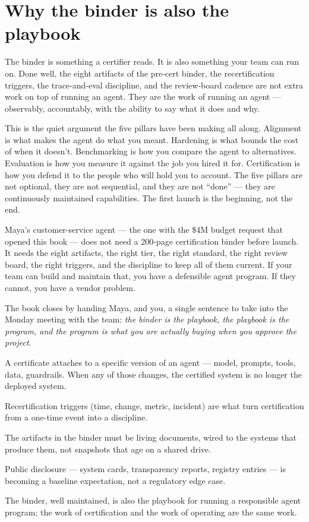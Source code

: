 \section{Why the binder is also the playbook}

The binder is something a certifier reads. It is also something your team can run on. Done well, the eight artifacts of the pre-cert binder, the recertification triggers, the trace-and-eval discipline, and the review-board cadence are not extra work on top of running an agent. They are the work of running an agent --- observably, accountably, with the ability to say what it does and why.

This is the quiet argument the five pillars have been making all along. Alignment is what makes the agent do what you meant. Hardening is what bounds the cost of when it doesn't. Benchmarking is how you compare the agent to alternatives. Evaluation is how you measure it against the job you hired it for. Certification is how you defend it to the people who will hold you to account. The five pillars are not optional, they are not sequential, and they are not ``done'' --- they are continuously maintained capabilities. The first launch is the beginning, not the end.

Maya's customer-service agent --- the one with the \$4M budget request that opened this book --- does not need a 200-page certification binder before launch. It needs the eight artifacts, the right tier, the right standard, the right review board, the right triggers, and the discipline to keep all of them current. If your team can build and maintain that, you have a defensible agent program. If they cannot, you have a vendor problem.

The book closes by handing Maya, and you, a single sentence to take into the Monday meeting with the team: \textit{the binder is the playbook, the playbook is the program, and the program is what you are actually buying when you approve the project.}

\TNrule

\stoptwocol

\begin{TNkeytakeaways}
\item A certificate attaches to a specific version of an agent --- model, prompts, tools, data, guardrails. When any of those changes, the certified system is no longer the deployed system.
\item Recertification triggers (time, change, metric, incident) are what turn certification from a one-time event into a discipline.
\item The artifacts in the binder must be living documents, wired to the systems that produce them, not snapshots that age on a shared drive.
\item Public disclosure --- system cards, transparency reports, registry entries --- is becoming a baseline expectation, not a regulatory edge case.
\item The binder, well maintained, is also the playbook for running a responsible agent program; the work of certification and the work of operating are the same work.
\end{TNkeytakeaways}


